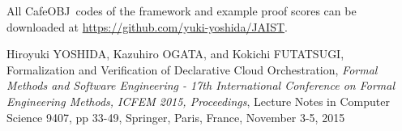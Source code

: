 \documentclass[12pt]{report}
\newcommand{\cafeobj}{{\sf CafeOBJ}~}
\begin{document}
All \cafeobj codes of the framework and example proof scores
can be downloaded at \url{https://github.com/yuki-yoshida/JAIST}.

\appendix




\begin{publication}

\item
Hiroyuki YOSHIDA, Kazuhiro OGATA, and Kokichi FUTATSUGI,
Formalization and Verification of Declarative Cloud Orchestration,
\emph{Formal Methods and Software Engineering - 17th International Conference
               on Formal Engineering Methods, {ICFEM} 2015, Proceedings}, 
Lecture Notes in Computer Science 9407,
pp 33-49, 
Springer,
Paris, France,
November 3-5, 2015

\end{publication}
\end{document}
